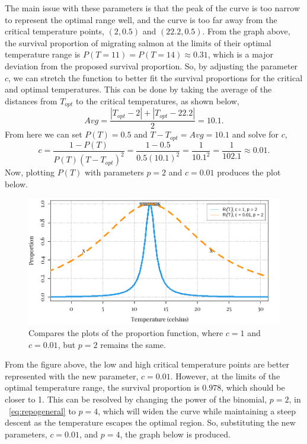 The main issue with these parameters is that the peak of the curve is too narrow to represent the optimal range well, and the curve is too far away from the critical temperature points, $(2,0.5)$ and $(22.2,0.5)$. 
From the graph above, the survival proportion of migrating salmon at the limits of their optimal temperature range is $P(T=11)=P(T=14)\approx0.31$, which is a major deviation from the proposed survival proportion.
So, by adjusting the parameter $c$, we can stretch the function to better fit the survival proportions for the critical and optimal temperatures.
This can be done by taking the average of the distances from $T_{opt}$ to the critical temperatures, as shown below,
\[
Avg = \frac{|T_{opt}-2| + |T_{opt}-22.2|}{2} = 10.1.
\]
From here we can set $P(T)=0.5$ and $T-T_{opt}=Avg=10.1$ and solve for $c$,
\[
c = \frac{1-P(T)}{P(T)(T-T_{opt})^2} = \frac{1-0.5}{0.5(10.1)^2} = \frac{1}{10.1^2} = \frac{1}{102.1}\approx0.01.
\]
Now, plotting $P(T)$ with parameters $p=2$ and $c=0.01$ produces the plot below.
\begin{figure}[H]
    \centering
    \includegraphics[width=14cm]{Pictures/Salmon Pop/salmon repo model/Repo c1 and c01.png}
    \caption{\singlespacing
    Compares the plots of the proportion function, where $c=1$ and $c=0.01$, but $p=2$ remains the same.}
    \label{fig:reporductioncurve2c1c01}
\end{figure}
From the figure above, the low and high critical temperature points are better represented with the new parameter, $c=0.01$.
However, at the limits of the optimal temperature range, the survival proportion is $0.978$, which should be closer to 1.
This can be resolved by changing the power of the binomial, $p=2$, in \equationautorefname~\eqref{eq:repogeneral} to $p=4$, which will widen the curve while maintaining a steep descent as the temperature escapes the optimal region.
So, substituting the new parameters, $c=0.01$, and $p=4$, the graph below is produced.
